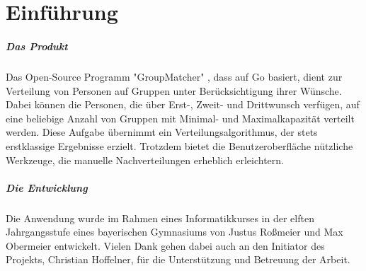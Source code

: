 \chapter{Einführung}
\label{ch:einführung}

\paragraph{Das Produkt} Das Open-Source Programm "GroupMatcher" , dass auf Go basiert, dient zur Verteilung von Personen auf Gruppen unter Berücksichtigung ihrer Wünsche. Dabei können die Personen, die über Erst-, Zweit- und Drittwunsch verfügen, auf eine beliebige Anzahl von Gruppen mit Minimal- und Maximalkapazität verteilt werden. Diese Aufgabe übernimmt ein Verteilungsalgorithmus, der stets erstklassige Ergebnisse erzielt. Trotzdem bietet die Benutzeroberfläche nützliche Werkzeuge, die manuelle Nachverteilungen erheblich erleichtern.
\paragraph{Die Entwicklung} Die Anwendung wurde im Rahmen eines Informatikkurses in der elften Jahrgangsstufe eines bayerischen Gymnasiums von Justus Roßmeier und Max Obermeier entwickelt. Vielen Dank gehen dabei auch an den Initiator des Projekts, Christian Hoffelner, für die Unterstützung und Betreuung der Arbeit.
